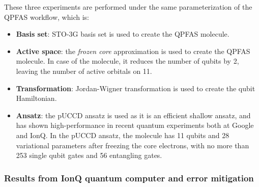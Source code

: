 \documentclass[journal,onecolumn]{IEEEtran}
\begin{document}
These three experiments are performed under the same parameterization of the QPFAS workflow, which is:
\begin{itemize}
    \item \textbf{Basis set}: STO-3G basis set is used to create the QPFAS molecule.
    \item \textbf{Active space}: the \textit{frozen core} approximation is used to create the QPFAS molecule. In case of the  molecule, it reduces the number of qubits by 2, leaving the number of active orbitals on 11.
    \item \textbf{Transformation}: Jordan-Wigner transformation is used to create the qubit Hamiltonian.
    \item \textbf{Ansatz}: the pUCCD ansatz is used as it is an efficient shallow ansatz, and has shown high-performance in recent quantum experiments both at Google\cite{OBrien2022-aa} and IonQ\cite{Zhao2023-um}. 
    In the pUCCD ansatz, the  molecule has 11 qubits and 28 variational parameters after freezing the core electrons, with no more than 253 single qubit gates and 56 entangling gates.
\end{itemize}


\subsubsection{Results from IonQ quantum computer and error mitigation}
\label{sec:results_from_ionq_quantum_computer}

\end{document}
